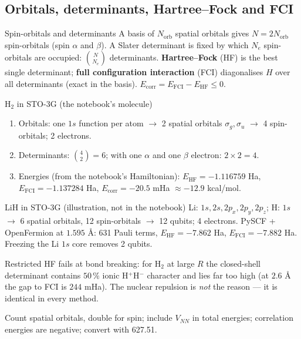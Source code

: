 \documentclass[11pt,a4paper,openany]{book}
\newcounter{wex}[chapter]
\newenvironment{steps}{\begin{enumerate}[label=\textbf{Step \arabic*.}, leftmargin=4.2em, itemsep=2pt]}{\end{enumerate}}
\begin{document}
\subsection{Orbitals, determinants, Hartree--Fock and FCI}
\begin{defn}{Spin-orbitals and determinants}
A basis of $N_{\mathrm{orb}}$ spatial orbitals gives $N = 2N_{\mathrm{orb}}$ spin-orbitals (spin $\alpha$ and $\beta$). A Slater determinant is fixed by which $N_e$
spin-orbitals are occupied: $\binom{N}{N_e}$ determinants. \textbf{Hartree--Fock} (HF) is the best single determinant; \textbf{full configuration interaction}
(FCI) diagonalises $H$ over all determinants (exact in the basis). $E_{\mathrm{corr}} = E_{\mathrm{FCI}} - E_{\mathrm{HF}} \le 0$.
\end{defn}
\begin{wexample}{H$_2$ in STO-3G (the notebook's molecule)}
\begin{steps}
\item Orbitals: one $1s$ function per atom $\to$ 2 spatial orbitals $\sigma_g, \sigma_u$ $\to$ 4 spin-orbitals; 2 electrons.
\item Determinants: $\binom42 = 6$; with one $\alpha$ and one $\beta$ electron: $2\times2 = 4$.
\item Energies (from the notebook's Hamiltonian): $E_{\mathrm{HF}} = -1.116759$ Ha, $E_{\mathrm{FCI}} = -1.137284$ Ha, $E_{\mathrm{corr}} = -20.5$ mHa $\approx -12.9$ kcal/mol.
\end{steps}
\end{wexample}
\begin{wexample}{LiH in STO-3G (illustration, not in the notebook)}
Li: $1s, 2s, 2p_x, 2p_y, 2p_z$; H: $1s$ $\to$ 6 spatial orbitals, 12 spin-orbitals $\to$ 12 qubits; 4 electrons. PySCF + OpenFermion at
$1.595$ \AA: 631 Pauli terms, $E_{\mathrm{HF}} = -7.862$ Ha, $E_{\mathrm{FCI}} = -7.882$ Ha. Freezing the Li $1s$ core removes 2 qubits.
\end{wexample}
\begin{trap}
Restricted HF fails at bond breaking: for H$_2$ at large $R$ the closed-shell determinant contains $50\,\%$ ionic H$^+$H$^-$ character and lies far
too high (at $2.6$ \AA{} the gap to FCI is $244$ mHa). The nuclear repulsion is \emph{not} the reason --- it is identical in every method.
\end{trap}
\begin{checklist}
Count spatial orbitals, double for spin; include $V_{NN}$ in total energies; correlation energies are negative; convert with 627.51.
\end{checklist}
\end{document}
